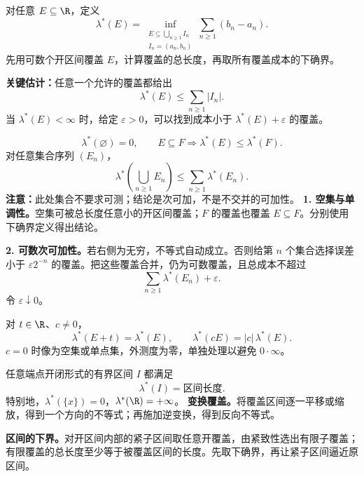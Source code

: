 对任意 $E\subseteq\R$，定义
\[
\lambda^*(E)=
\inf_{\substack{E\subseteq\bigcup_{n\ge1}I_n\\ I_n=(a_n,b_n)}}
\sum_{n\ge1}(b_n-a_n).
\]
先用可数个开区间覆盖 $E$，计算覆盖的总长度，再取所有覆盖成本的下确界。

\textbf{关键估计：}任意一个允许的覆盖都给出
\[
\lambda^*(E)\le\sum_{n\ge1}|I_n|.
\]
当 $\lambda^*(E)<\infty$ 时，给定 $\varepsilon>0$，可以找到成本小于 $\lambda^*(E)+\varepsilon$ 的覆盖。

\[
\lambda^*(\varnothing)=0,\qquad
E\subseteq F\Longrightarrow\lambda^*(E)\le\lambda^*(F).
\]
对任意集合序列 $(E_n)$，
\[
\lambda^*\!\left(\bigcup_{n\ge1}E_n\right)
\le\sum_{n\ge1}\lambda^*(E_n).
\]
\textbf{注意：}此处集合不要求可测；结论是次可加，不是不交并的可加性。
\textbf{1. 空集与单调性。}空集可被总长度任意小的开区间覆盖；$F$ 的覆盖也覆盖 $E\subseteq F$。分别使用下确界定义得出结论。

\textbf{2. 可数次可加性。}若右侧为无穷，不等式自动成立。否则给第 $n$ 个集合选择误差小于 $\varepsilon2^{-n}$ 的覆盖。把这些覆盖合并，仍为可数覆盖，且总成本不超过
\[
\sum_{n\ge1}\lambda^*(E_n)+\varepsilon.
\]
令 $\varepsilon\downarrow0$。

对 $t\in\R$、$c\ne0$，
\[
\lambda^*(E+t)=\lambda^*(E),\qquad
\lambda^*(cE)=|c|\,\lambda^*(E).
\]
$c=0$ 时像为空集或单点集，外测度为零，单独处理以避免 $0\cdot\infty$。

任意端点开闭形式的有界区间 $I$ 都满足
\[
\lambda^*(I)=\text{区间长度}.
\]
特别地，$\lambda^*(\{x\})=0$，$\lambda^*(\R)=+\infty$。
\textbf{变换覆盖。}将覆盖区间逐一平移或缩放，得到一个方向的不等式；再施加逆变换，得到反向不等式。

\textbf{区间的下界。}对开区间内部的紧子区间取任意开覆盖，由紧致性选出有限子覆盖；有限覆盖的总长度至少等于被覆盖区间的长度。先取下确界，再让紧子区间逼近原区间。

